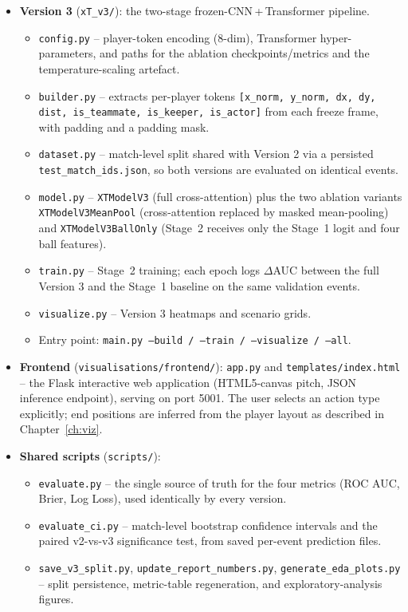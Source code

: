 \begin{itemize}
    \item \textbf{Version 3} (\texttt{xT\_v3/}): the two-stage frozen-CNN\,+\,Transformer pipeline.
    \begin{itemize}
        \item \texttt{config.py} -- player-token encoding (8-dim), Transformer hyper-parameters, and paths for the ablation checkpoints/metrics and the temperature-scaling artefact.
        \item \texttt{builder.py} -- extracts per-player tokens \texttt{[x\_norm, y\_norm, dx, dy, dist, is\_teammate, is\_keeper, is\_actor]} from each freeze frame, with padding and a padding mask.
        \item \texttt{dataset.py} -- match-level split shared with Version 2 via a persisted \texttt{test\_match\_ids.json}, so both versions are evaluated on identical events.
        \item \texttt{model.py} -- \texttt{XTModelV3} (full cross-attention) plus the two ablation variants \texttt{XTModelV3MeanPool} (cross-attention replaced by masked mean-pooling) and \texttt{XTModelV3BallOnly} (Stage~2 receives only the Stage~1 logit and four ball features).
        \item \texttt{train.py} -- Stage~2 training; each epoch logs $\Delta$AUC between the full Version 3 and the Stage~1 baseline on the same validation events.
        \item \texttt{visualize.py} -- Version 3 heatmaps and scenario grids.
        \item Entry point: \texttt{main.py --build / --train / --visualize / --all}.
    \end{itemize}

    \item \textbf{Frontend} (\texttt{visualisations/frontend/}): \texttt{app.py} and \texttt{templates/index.html} -- the Flask interactive web application (HTML5-canvas pitch, JSON inference endpoint), serving on port 5001. The user selects an action type explicitly; end positions are inferred from the player layout as described in Chapter~\ref{ch:viz}.

    \item \textbf{Shared scripts} (\texttt{scripts/}):
    \begin{itemize}
        \item \texttt{evaluate.py} -- the single source of truth for the four metrics (ROC AUC, Brier, Log Loss), used identically by every version.
        \item \texttt{evaluate\_ci.py} -- match-level bootstrap confidence intervals and the paired v2-vs-v3 significance test, from saved per-event prediction files.
        \item \texttt{save\_v3\_split.py}, \texttt{update\_report\_numbers.py}, \texttt{generate\_eda\_plots.py} -- split persistence, metric-table regeneration, and exploratory-analysis figures.
    \end{itemize}
\end{itemize}

